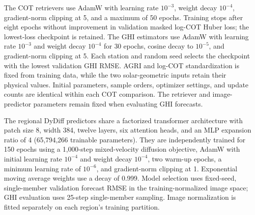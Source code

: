The COT retrievers use AdamW with learning rate $10^{-3}$, weight decay $10^{-4}$, gradient-norm clipping at 5, and a maximum of 50 epochs. Training stops after eight epochs without improvement in validation masked log-COT Huber loss; the lowest-loss checkpoint is retained. The GHI estimators use AdamW with learning rate $10^{-3}$ and weight decay $10^{-4}$ for 30 epochs, cosine decay to $10^{-5}$, and gradient-norm clipping at 5. Each station and random seed selects the checkpoint with the lowest validation GHI RMSE. AGRI and log-COT standardization is fixed from training data, while the two solar-geometric inputs retain their physical values. Initial parameters, sample orders, optimizer settings, and update counts are identical within each COT comparison. The retriever and image-predictor parameters remain fixed when evaluating GHI forecasts.

The regional DyDiff predictors share a factorized transformer architecture with patch size 8, width 384, twelve layers, six attention heads, and an MLP expansion ratio of 4 (65,794,266 trainable parameters). They are independently trained for 150 epochs using a 1,000-step mixed-velocity diffusion objective, AdamW with initial learning rate $10^{-4}$ and weight decay $10^{-4}$, two warm-up epochs, a minimum learning rate of $10^{-6}$, and gradient-norm clipping at 1. Exponential moving average weights use a decay of 0.999. Model selection uses fixed-seed, single-member validation forecast RMSE in the training-normalized image space; GHI evaluation uses 25-step single-member sampling. Image normalization is fitted separately on each region's training partition.
